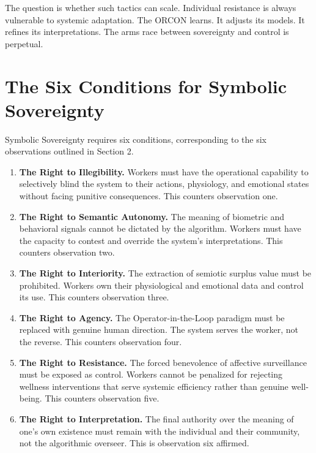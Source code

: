 \documentclass[runningheads]{llncs}
\begin{document}
The question is whether such tactics can scale. Individual resistance is always vulnerable to systemic adaptation. The ORCON learns. It adjusts its models. It refines its interpretations. The arms race between sovereignty and control is perpetual.

\section{The Six Conditions for Symbolic Sovereignty}

Symbolic Sovereignty requires six conditions, corresponding to the six observations outlined in Section 2.

\begin{enumerate}
    \item \textbf{The Right to Illegibility.} Workers must have the operational capability to selectively blind the system to their actions, physiology, and emotional states without facing punitive consequences. This counters observation one.

    \item \textbf{The Right to Semantic Autonomy.} The meaning of biometric and behavioral signals cannot be dictated by the algorithm. Workers must have the capacity to contest and override the system's interpretations. This counters observation two.

    \item \textbf{The Right to Interiority.} The extraction of semiotic surplus value must be prohibited. Workers own their physiological and emotional data and control its use. This counters observation three.

    \item \textbf{The Right to Agency.} The Operator-in-the-Loop paradigm must be replaced with genuine human direction. The system serves the worker, not the reverse. This counters observation four.

    \item \textbf{The Right to Resistance.} The forced benevolence of affective surveillance must be exposed as control. Workers cannot be penalized for rejecting wellness interventions that serve systemic efficiency rather than genuine well-being. This counters observation five.

    \item \textbf{The Right to Interpretation.} The final authority over the meaning of one's own existence must remain with the individual and their community, not the algorithmic overseer. This is observation six affirmed.
\end{enumerate}
\end{document}
